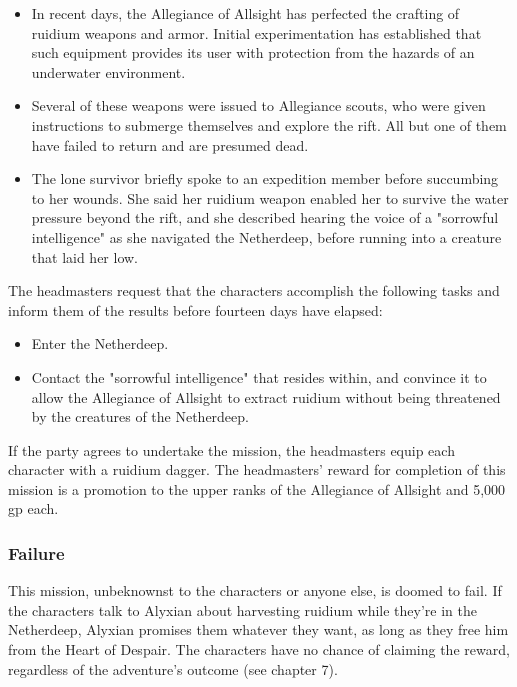 \documentclass[10pt,a4paper,twoside,bg=print,twocolumn,openany,nodeprecatedcode]{dndbook}
\begin{document}
\begin{itemize}
\item In recent days, the Allegiance of Allsight has perfected the crafting of ruidium weapons and armor. Initial experimentation has established that such equipment provides its user with protection from the hazards of an underwater environment.
\item Several of these weapons were issued to Allegiance scouts, who were given instructions to submerge themselves and explore the rift. All but one of them have failed to return and are presumed dead.
\item The lone survivor briefly spoke to an expedition member before succumbing to her wounds. She said her ruidium weapon enabled her to survive the water pressure beyond the rift, and she described hearing the voice of a "sorrowful intelligence" as she navigated the Netherdeep, before running into a creature that laid her low.
\end{itemize}

The headmasters request that the characters accomplish the following tasks and inform them of the results before fourteen days have elapsed:


\begin{itemize}
\item Enter the Netherdeep.
\item Contact the "sorrowful intelligence" that resides within, and convince it to allow the Allegiance of Allsight to extract ruidium without being threatened by the creatures of the Netherdeep.
\end{itemize}

If the party agrees to undertake the mission, the headmasters equip each character with a ruidium dagger. The headmasters' reward for completion of this mission is a promotion to the upper ranks of the Allegiance of Allsight and 5,000 gp each.

\subsubsection{Failure}
This mission, unbeknownst to the characters or anyone else, is doomed to fail. If the characters talk to Alyxian about harvesting ruidium while they're in the Netherdeep, Alyxian promises them whatever they want, as long as they free him from the Heart of Despair. The characters have no chance of claiming the reward, regardless of the adventure's outcome (see chapter 7).
\end{document}
